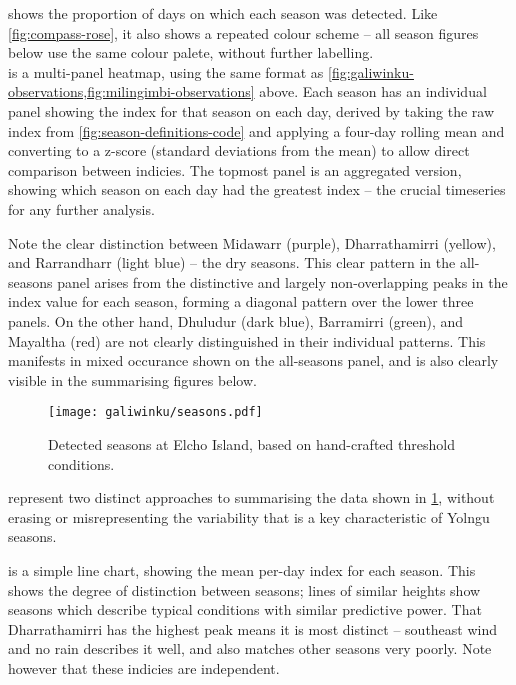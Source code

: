  shows the proportion of days on which
each season was detected.  Like \cref{fig:compass-rose}, it also
shows a repeated colour scheme -- all season figures below use the
same colour palete, without further labelling.\\


 is a multi-panel heatmap, using the same format
as \cref{fig:galiwinku-observations,fig:milingimbi-observations} above.
Each season has an individual panel showing the index for that season on each
day, derived by taking the raw index from \cref{fig:season-definitions-code}
and applying a four-day rolling mean and converting to a z-score (standard
deviations from the mean) to allow direct comparison between indicies.
%
The topmost panel is an aggregated version, showing which season on each day
had the greatest index -- the crucial timeseries for any further analysis.

Note the clear distinction between Midawarr (purple), Dharrathamirri (yellow),
and Rarrandharr (light blue) -- the dry seasons.  This clear pattern in the
all-seasons panel arises from the distinctive and largely non-overlapping
peaks in the index value for each season, forming a diagonal pattern over
the lower three panels.
%
On the other hand, Dhuludur (dark blue), Barramirri (green), and Mayaltha
(red) are not clearly distinguished in their individual patterns.  This
manifests in mixed occurance shown on the all-seasons panel, and is also
clearly visible in the summarising figures below.\\


\begin{figure}[p]
    \centering
    \texttt{[image: galiwinku/seasons.pdf]}
    \caption[Detected seasons for Elcho Island]{
        Detected seasons at Elcho Island, based on hand-crafted threshold
        conditions.  
        }
    \label{fig:galiwinku-seasons}
\end{figure}


 represent two distinct
approaches to summarising the data shown in \cref{fig:galiwinku-seasons},
without erasing or misrepresenting the variability that is a key
characteristic of Yolngu seasons.

 is a simple line chart, showing the mean
per-day index for each season.  This shows the degree of distinction
between seasons; lines of similar heights show seasons which describe
typical conditions with similar predictive power.  That Dharrathamirri
has the highest peak means it is most distinct -- southeast wind and no
rain describes it well, and also matches other seasons very poorly.
Note however that these indicies are independent.\\

